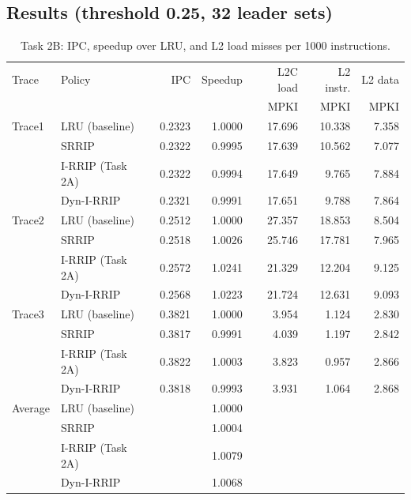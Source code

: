 \documentclass[11pt]{article}
\begin{document}
\subsection{Results (threshold 0.25, 32 leader sets)}

\begin{table}[H]
\centering
\begin{tabular}{llrrrrr}
\toprule
Trace & Policy & IPC & Speedup & L2C load & L2 instr. & L2 data\\
      &        &     &         & MPKI     & MPKI      & MPKI\\
\midrule
Trace1 & LRU (baseline)   & 0.2323 & 1.0000 & 17.696 & 10.338 & 7.358\\
       & SRRIP            & 0.2322 & 0.9995 & 17.639 & 10.562 & 7.077\\
       & I-RRIP (Task 2A) & 0.2322 & 0.9994 & 17.649 &  9.765 & 7.884\\
       & Dyn-I-RRIP       & 0.2321 & 0.9991 & 17.651 &  9.788 & 7.864\\
\midrule
Trace2 & LRU (baseline)   & 0.2512 & 1.0000 & 27.357 & 18.853 & 8.504\\
       & SRRIP            & 0.2518 & 1.0026 & 25.746 & 17.781 & 7.965\\
       & I-RRIP (Task 2A) & 0.2572 & 1.0241 & 21.329 & 12.204 & 9.125\\
       & Dyn-I-RRIP       & 0.2568 & 1.0223 & 21.724 & 12.631 & 9.093\\
\midrule
Trace3 & LRU (baseline)   & 0.3821 & 1.0000 &  3.954 &  1.124 & 2.830\\
       & SRRIP            & 0.3817 & 0.9991 &  4.039 &  1.197 & 2.842\\
       & I-RRIP (Task 2A) & 0.3822 & 1.0003 &  3.823 &  0.957 & 2.866\\
       & Dyn-I-RRIP       & 0.3818 & 0.9993 &  3.931 &  1.064 & 2.868\\
\midrule
Average & LRU (baseline)   & & 1.0000 & & & \\
        & SRRIP            & & 1.0004 & & & \\
        & I-RRIP (Task 2A) & & 1.0079 & & & \\
        & Dyn-I-RRIP       & & 1.0068 & & & \\
\bottomrule
\end{tabular}
\caption{Task 2B: IPC, speedup over LRU, and L2 load misses per 1000 instructions.}
\label{tab:t2b-results}
\end{table}
\end{document}

